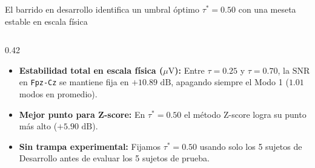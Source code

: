 \documentclass[aspectratio=169,9pt]{beamer}
\begin{document}
\begin{frame}{El barrido en desarrollo identifica un umbral \'optimo $\tau^* = 0.50$ con una meseta estable en escala f\'isica}
\begin{columns}[T,onlytextwidth]
\begin{column}{0.42\textwidth}
      \vspace{0.08cm}

      \begin{tcolorbox}[tealcard, title={\scriptsize\bfseries ?`Por qu\'e elegimos $\tau^* = 0.50$?}, colbacktitle=UDTeal!85!black, coltitle=white]
        \scriptsize
        \begin{itemize}
          \item \textbf{Estabilidad total en escala f\'isica ($\mu\text{V}$):} Entre $\tau=0.25$ y $\tau=0.70$, la $\text{SNR}$ en \texttt{Fpz-Cz} se mantiene fija en $+10.89\text{ dB}$, apagando siempre el Modo 1 ($1.01$ modos en promedio).
          \item \textbf{Mejor punto para Z-score:} En $\tau^*=0.50$ el m\'etodo Z-score logra su punto m\'as alto ($+5.90\text{ dB}$).
          \item \textbf{Sin trampa experimental:} Fijamos $\tau^*=0.50$ usando solo los 5 sujetos de Desarrollo antes de evaluar los 5 sujetos de prueba.
        \end{itemize}
      \end{tcolorbox}
    \end{column}
  \end{columns}
\end{frame}
\end{document}
